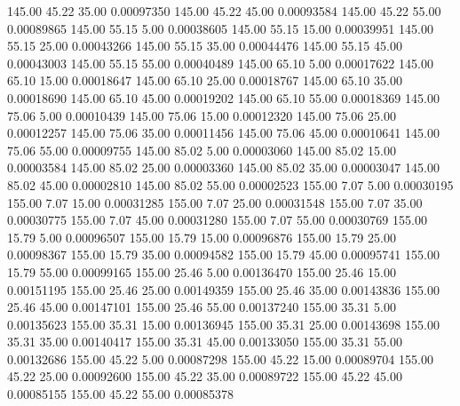     145.00     45.22     35.00     0.00097350
    145.00     45.22     45.00     0.00093584
    145.00     45.22     55.00     0.00089865
    145.00     55.15      5.00     0.00038605
    145.00     55.15     15.00     0.00039951
    145.00     55.15     25.00     0.00043266
    145.00     55.15     35.00     0.00044476
    145.00     55.15     45.00     0.00043003
    145.00     55.15     55.00     0.00040489
    145.00     65.10      5.00     0.00017622
    145.00     65.10     15.00     0.00018647
    145.00     65.10     25.00     0.00018767
    145.00     65.10     35.00     0.00018690
    145.00     65.10     45.00     0.00019202
    145.00     65.10     55.00     0.00018369
    145.00     75.06      5.00     0.00010439
    145.00     75.06     15.00     0.00012320
    145.00     75.06     25.00     0.00012257
    145.00     75.06     35.00     0.00011456
    145.00     75.06     45.00     0.00010641
    145.00     75.06     55.00     0.00009755
    145.00     85.02      5.00     0.00003060
    145.00     85.02     15.00     0.00003584
    145.00     85.02     25.00     0.00003360
    145.00     85.02     35.00     0.00003047
    145.00     85.02     45.00     0.00002810
    145.00     85.02     55.00     0.00002523
    155.00      7.07      5.00     0.00030195
    155.00      7.07     15.00     0.00031285
    155.00      7.07     25.00     0.00031548
    155.00      7.07     35.00     0.00030775
    155.00      7.07     45.00     0.00031280
    155.00      7.07     55.00     0.00030769
    155.00     15.79      5.00     0.00096507
    155.00     15.79     15.00     0.00096876
    155.00     15.79     25.00     0.00098367
    155.00     15.79     35.00     0.00094582
    155.00     15.79     45.00     0.00095741
    155.00     15.79     55.00     0.00099165
    155.00     25.46      5.00     0.00136470
    155.00     25.46     15.00     0.00151195
    155.00     25.46     25.00     0.00149359
    155.00     25.46     35.00     0.00143836
    155.00     25.46     45.00     0.00147101
    155.00     25.46     55.00     0.00137240
    155.00     35.31      5.00     0.00135623
    155.00     35.31     15.00     0.00136945
    155.00     35.31     25.00     0.00143698
    155.00     35.31     35.00     0.00140417
    155.00     35.31     45.00     0.00133050
    155.00     35.31     55.00     0.00132686
    155.00     45.22      5.00     0.00087298
    155.00     45.22     15.00     0.00089704
    155.00     45.22     25.00     0.00092600
    155.00     45.22     35.00     0.00089722
    155.00     45.22     45.00     0.00085155
    155.00     45.22     55.00     0.00085378
